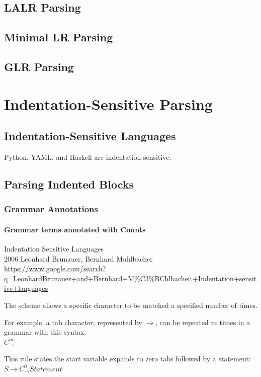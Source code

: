 \documentclass{book}
\begin{document}
\section{LALR Parsing}
\section{Minimal LR Parsing}
\section{GLR Parsing}

%
%
\chapter{Indentation-Sensitive Parsing}

\section{Indentation-Sensitive Languages}
Python, YAML, and Haskell are indentation sensitive.

\section{Parsing Indented Blocks}
\subsection{Grammar Annotations}

\subsubsection{Grammar terms annotated with Counts}
Indentation Sensitive Languages\\
2006 Leonhard Brunauer, Bernhard Muhlbacher\\
\url{https://www.google.com/search?q=LeonhardBrunauer+and+Bernhard+M%C3%BChlbacher.+Indentation+sensitive+languages}

The scheme allows a specific character to be matched a specified number of times.

For example, a tab character, represented by $\rightarrow$, can be repeated $m$ 
times in a grammar with this syntax:\\
$C_\rightarrow^m$

This rule states the start variable expands to zero tabs followed by a statement:\\
$S\rightarrow C_\rightarrow^0 Statement$
\end{document}
